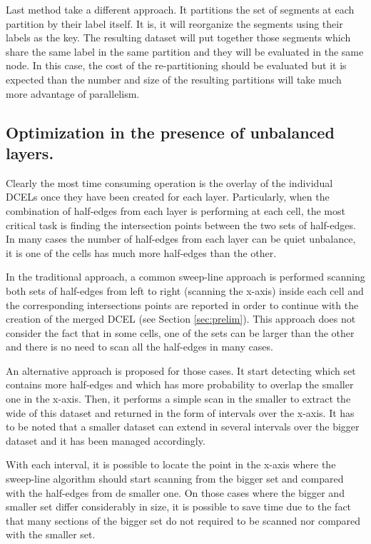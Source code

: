 Last method take a different approach.  It partitions the set of segments at each partition by their label itself.  It is, it will reorganize the segments using their labels as the key.  The resulting dataset will put together those segments which share the same label in the same partition and they will be evaluated in the same node.  In this case, the cost of the re-partitioning should be evaluated but it is expected than the number and size of the resulting partitions will take much more advantage of parallelism.

\subsection{Optimization in the presence of unbalanced layers.}\label{sec:unbalance}
Clearly the most time consuming operation is the overlay of the individual DCELs once they have been created for each layer.  Particularly, when the combination of half-edges from each layer is performing at each cell, the most critical task is finding the intersection points between the two sets of half-edges. In many cases the number of half-edges from each layer can be quiet unbalance, it is one of the cells has much more half-edges than the other.

In the traditional approach, a common sweep-line approach is performed scanning both sets of half-edges from left to right (scanning the x-axis) inside each cell and the corresponding intersections points are reported in order to continue with the creation of the merged DCEL (see Section \ref{sec:prelim}). This approach does not consider the fact that in some cells, one of the sets can be larger than the other and there is no need to scan all the half-edges in many cases.

An alternative approach is proposed for those cases.  It start detecting which set contains more half-edges and which has more probability to overlap the smaller one in the x-axis. Then, it performs a simple scan in the smaller to extract the wide of this dataset and returned in the form of intervals over the x-axis.  It has to be noted that a smaller dataset can extend in several intervals over the bigger dataset and it has been managed accordingly.  

With each interval, it is possible to locate the point in the x-axis where the sweep-line algorithm should start scanning from the bigger set and compared with the half-edges from de smaller one. On those cases where the bigger and smaller set differ considerably in size, it is possible to save time due to the fact that many sections of the bigger set do not required to be scanned nor compared with the smaller set.